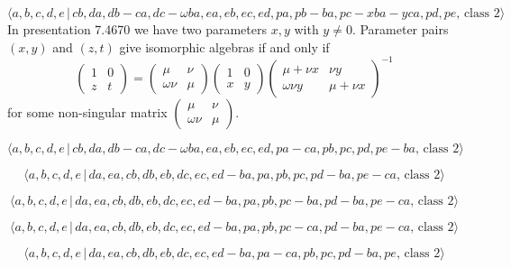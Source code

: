 \documentclass[10pt]{article}
\begin{document}
\begin{equation}
\langle a,b,c,d,e\,|\,cb,da,db-ca,dc-\omega
ba,ea,eb,ec,ed,pa,pb-ba,pc-xba-yca,pd,pe,\,\text{class }2\rangle 
\tag{7.4670}
\end{equation}%
In presentation 7.4670 we have two parameters $x,y$ with $y\neq 0$.
Parameter pairs $(x,y)$ and $(z,t)$ give isomorphic algebras if and only if%
\[
\left( 
\begin{array}{ll}
1 & 0 \\ 
z & t%
\end{array}%
\right) =\left( 
\begin{array}{ll}
\mu & \nu \\ 
\omega \nu & \mu%
\end{array}%
\right) \left( 
\begin{array}{ll}
1 & 0 \\ 
x & y%
\end{array}%
\right) \left( 
\begin{array}{ll}
\mu +\nu x & \nu y \\ 
\omega \nu y & \mu +\nu x%
\end{array}%
\right) ^{-1} 
\]%
for some non-singular matrix $\left( 
\begin{array}{ll}
\mu & \nu \\ 
\omega \nu & \mu%
\end{array}%
\right) $.

\begin{equation}
\langle a,b,c,d,e\,|\,cb,da,db-ca,dc-\omega
ba,ea,eb,ec,ed,pa-ca,pb,pc,pd,pe-ba,\,\text{class }2\rangle  \tag{7.4671}
\end{equation}

\begin{equation}
\langle a,b,c,d,e\,|\,da,ea,cb,db,eb,dc,ec,ed-ba,pa,pb,pc,pd-ba,pe-ca,\,%
\text{class }2\rangle  \tag{7.4672}
\end{equation}

\begin{equation}
\langle a,b,c,d,e\,|\,da,ea,cb,db,eb,dc,ec,ed-ba,pa,pb,pc-ba,pd-ba,pe-ca,\,%
\text{class }2\rangle  \tag{7.4673}
\end{equation}

\begin{equation}
\langle a,b,c,d,e\,|\,da,ea,cb,db,eb,dc,ec,ed-ba,pa,pb,pc-ca,pd-ba,pe-ca,\,%
\text{class }2\rangle  \tag{7.4674}
\end{equation}

\begin{equation}
\langle a,b,c,d,e\,|\,da,ea,cb,db,eb,dc,ec,ed-ba,pa-ca,pb,pc,pd-ba,pe,\,%
\text{class }2\rangle  \tag{7.4675}
\end{equation}
\end{document}
